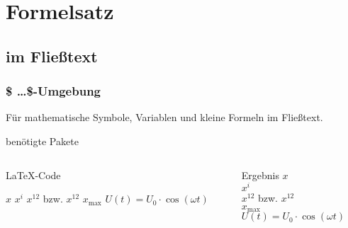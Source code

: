 \section{Formelsatz}
\subsection{im Fließtext}
\begin{frame}[fragile]
   \frametitle{\$ \dots \$-Umgebung}
   Für mathematische Symbole, Variablen und kleine Formeln im Fließtext. 

   \begin{block}{benötigte Pakete}
    \begin{lstverbatim}
        \usepackage{amsmath}
        \usepackage{mathtools}
        \usepackage{amssymb}
    \end{lstverbatim}
   \end{block}
    \begin{columns}[T]
        \begin{column}{0.6\textwidth}
            \begin{block}{\LaTeX-Code}
                \begin{lstverbatim}
                $x$ 
                $x^i$
                $x^12$ bzw. $x^{12}$ %
                $x_\text{max}$
                $U(t) = U_0 \cdot \cos(\omega t)$
                \end{lstverbatim}
            \end{block}
        \end{column}
        \begin{column}{0.35\textwidth}
            \begin{block}{Ergebnis}
                $x$  \\
                $x^i$ \\
                $x^12$ bzw. $x^{12}$ \\ 
                $x_\text{max}$ \\
                $U(t) = U_0 \cdot \cos(\omega t)$
            \end{block}
        \end{column}
    \end{columns}
\end{frame}
